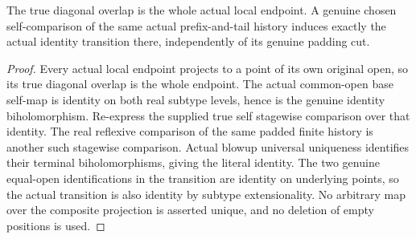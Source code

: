 \begin{theorem}
\label{hir:sharp-actual-endpoint-diagonal-transition}
\leanok
{}
The true diagonal overlap is the whole actual local endpoint. A genuine
chosen self-comparison of the same actual prefix-and-tail history induces
exactly the actual identity transition there, independently of its genuine
padding cut.
\end{theorem}
\begin{proof}
Every actual local endpoint projects to a point of its own original open,
so its true diagonal overlap is the whole endpoint. The actual common-open
base self-map is identity on both real subtype levels, hence is the genuine
identity biholomorphism. Re-express the supplied true self stagewise
comparison over that identity. The real reflexive comparison of the same
padded finite history is another such stagewise comparison. Actual blowup
universal uniqueness identifies their terminal biholomorphisms, giving the
literal identity. The two genuine equal-open identifications in the
transition are identity on underlying points, so the actual transition is
also identity by subtype extensionality. No arbitrary map over the composite
projection is asserted unique, and no deletion of empty positions is used.
\end{proof}
